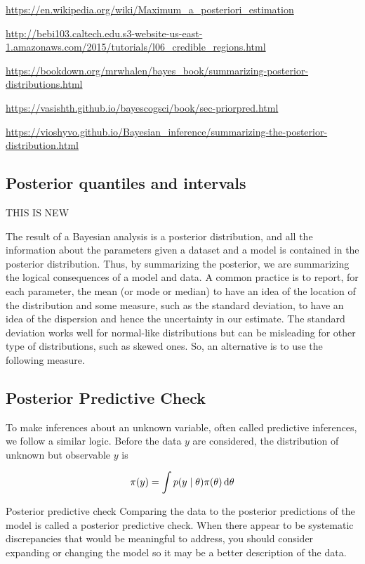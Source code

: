 \url{https://en.wikipedia.org/wiki/Maximum_a_posteriori_estimation}

\url{http://bebi103.caltech.edu.s3-website-us-east-1.amazonaws.com/2015/tutorials/l06_credible_regions.html}

\url{https://bookdown.org/mrwhalen/bayes_book/summarizing-posterior-distributions.html}

\url{https://vasishth.github.io/bayescogsci/book/sec-priorpred.html}

\url{https://vioshyvo.github.io/Bayesian_inference/summarizing-the-posterior-distribution.html}

\subsection{Posterior quantiles and intervals}




THIS IS NEW

The result of a Bayesian analysis is a posterior distribution, and all the information about the parameters given a dataset and a model is contained in the posterior distribution. Thus, by summarizing the posterior, we are summarizing the logical consequences of a model and data. A common practice is to report, for each parameter, the mean (or mode or median) to have an idea of the location of the distribution and some measure, such as the standard deviation, to have an idea of the dispersion and hence the uncertainty in our estimate. The standard deviation works well for normal-like distributions but can be misleading for other type of distributions, such as skewed ones. So, an alternative is to use the following measure.

\subsection{Posterior Predictive Check}

To make inferences about an unknown variable, often called predictive inferences, we follow a similar logic. Before the data $y$ are considered, the distribution of unknown but observable $y$ is 

\begin{equation}\label{eq:prior_predictive}
    \pi (y) = \int p \qty(y \mid \theta) \pi \qty(\theta) \dd{\theta}
\end{equation}


Posterior predictive check
Comparing the data to the posterior predictions of the model is called a posterior predictive check. When there appear to be systematic discrepancies that would be meaningful to address, you should consider expanding or changing the model so it may be a better description of the data.


